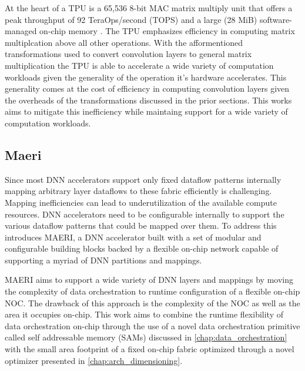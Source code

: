 At the heart of a TPU is a 65,536 8-bit MAC matrix multiply unit that offers a
peak throughput of 92 TeraOps/second (TOPS) and a large (28 MiB)
software-managed on-chip memory \cite{tpu}. The TPU emphasizes efficiency in
computing matrix multiplcation above all other operations. With the
afformentioned transformations used to convert convolution layers to general
matrix multiplication the TPU is able to accelerate a wide variety of
computation workloads given the generality of the operation it's hardware
accelerates. This generality comes at the cost of efficiency in computing
convolution layers given the overheads of the transformations discussed in the
prior sections. This works aims to mitigate this inefficiency while maintaing
support for a wide variety of computation workloads. 


\subsection{Maeri}
\label{chap:related_work:maeri}

Since most DNN accelerators support only fixed dataflow patterns internally
mapping arbitrary layer dataflows to these fabric efficiently is challenging.
Mapping inefficiencies can lead to underutilization of the available compute
resources. DNN accelerators need to be configurable internally to support the
various dataflow patterns that could be mapped over them. To address this
\cite{maeri} introduces MAERI, a DNN accelerator built with a set of modular and
configurable building blocks backed by a flexible on-chip network capable of
supporting a myriad of DNN partitions and mappings. 

MAERI aims to support a wide variety of DNN layers and mappings by moving the
complexity of data orchestration to runtime configuration of a flexible on-chip
NOC. The drawback of this approach is the complexity of the NOC as well as the
area it occupies on-chip. This work aims to combine the runtime flexibility of
data orchestration on-chip through the use of a novel data orchestration
primitive called self addressable memory (SAMs) discussed in
\autoref{chap:data_orchestration} with the small area footprint of a fixed
on-chip fabric optimized through a novel optimizer presented in
\autoref{chap:arch_dimensioning}. 





